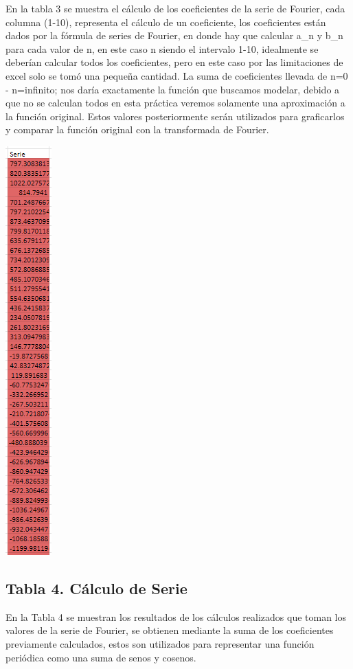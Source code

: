 En la tabla 3 se muestra el cálculo de los coeficientes de la serie de Fourier, cada columna (1-10), representa el cálculo de un coeficiente, los coeficientes están dados por la fórmula de series de Fourier, en donde hay que calcular a\_n y b\_n para cada valor de n, en este caso n siendo el intervalo 1-10, idealmente se deberían calcular todos los coeficientes, pero en este caso por las limitaciones de excel solo se tomó una pequeña cantidad. La suma de coeficientes llevada de n=0 - n=infinito; nos daría exactamente la función que buscamos modelar, debido a que no se calculan todos en esta práctica veremos solamente una aproximación a la función original. Estos valores posteriormente serán utilizados para graficarlos y comparar la función original con la transformada de Fourier.

\includegraphics[width=0.69792in,height=6.19792in]{media/image28.png}

\subsection{Tabla 4. Cálculo de Serie}\label{tabla-4.-cuxe1lculo-de-serie}

En la Tabla 4 se muestran los resultados de los cálculos realizados que toman los valores de la serie de Fourier, se obtienen mediante la suma de los coeficientes previamente calculados, estos son utilizados para representar una función periódica como una suma de senos y cosenos.
